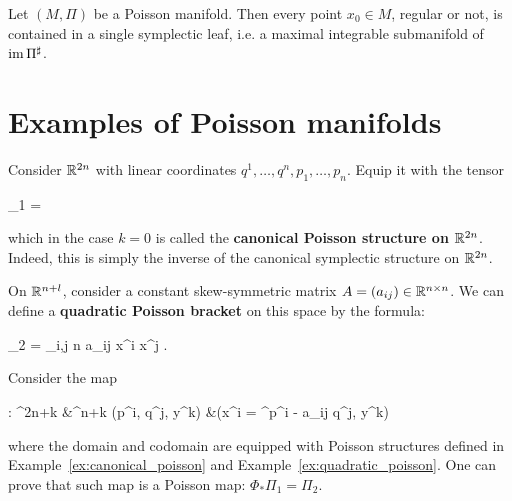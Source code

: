 \documentclass[main.tex]{subfiles}
\begin{document}
\begin{theorem}
	Let $(M, \Pi)$ be a Poisson manifold. Then every point $x_0 \in M$, regular or not, is contained in a single symplectic leaf, i.e. a maximal integrable submanifold of $\operatorname{im} \Pi^\sharp$.
\end{theorem}

\section{Examples of Poisson manifolds}

\begin{example}
\label{ex:canonical_poisson}
	Consider $\mathbb{R}^{2n}$ with linear coordinates $q^1, \ldots, q^n, p_1, \ldots, p_n$. Equip it with the tensor
	\begin{eqalign}
		\Pi_1 =  \wedge {}
	\end{eqalign}
	which in the case $k=0$ is called the \textbf{canonical Poisson structure on $\mathbb{R}^{2n}$}. Indeed, this is simply the inverse of the canonical symplectic structure on $\mathbb{R}^{2n}$.
\end{example}

\begin{example}
\label{ex:quadratic_poisson}
	On $\mathbb{R}^{n+l}$, consider a constant skew-symmetric matrix $A = (a_{ij}) \in \mathbb{R}^{n \times n}$. We can define a \textbf{quadratic Poisson bracket} on this space by the formula:
	\begin{eqalign}
	\label{eq:quadratic_poisson}
		\Pi_2 =  \sum_{i,j \leq n} a_{ij} x^i x^j  \wedge \pder{}{x_j}.
	\end{eqalign}
\end{example}

\begin{example}
	 Consider the map 
	 \begin{eqalign}
	 	\Phi : \R^{2n+k} &\longto \R^{n+k}
		(p^i, q^j, y^k) &\longmapsto (x^i = \e^{p^i -  a_{ij} q^j}, y^k)
	\end{eqalign}
	 where the domain and codomain are equipped with Poisson structures defined in Example~\ref{ex:canonical_poisson} and Example~\ref{ex:quadratic_poisson}. One can prove that such map is a Poisson map: $\Phi_* \Pi_1 = \Pi_2$.
\end{example}
\end{document}
